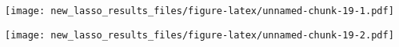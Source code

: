\documentclass[
]{article}
\newenvironment{Shaded}{\begin{snugshade}}{\end{snugshade}}
\newcommand{\DataTypeTok}[1]{\textcolor[rgb]{0.13,0.29,0.53}{#1}}
\newcommand{\DecValTok}[1]{\textcolor[rgb]{0.00,0.00,0.81}{#1}}
\newcommand{\KeywordTok}[1]{\textcolor[rgb]{0.13,0.29,0.53}{\textbf{#1}}}
\newcommand{\NormalTok}[1]{#1}
\newcommand{\OperatorTok}[1]{\textcolor[rgb]{0.81,0.36,0.00}{\textbf{#1}}}
\newcommand{\StringTok}[1]{\textcolor[rgb]{0.31,0.60,0.02}{#1}}
\begin{document}
\texttt{[image: new\_lasso\_results\_files/figure-latex/unnamed-chunk-19-1.pdf]}

\begin{Shaded}
\end{Shaded}

\texttt{[image: new\_lasso\_results\_files/figure-latex/unnamed-chunk-19-2.pdf]}

\begin{Shaded}
\end{Shaded}
\end{document}
